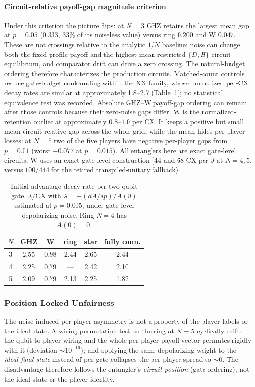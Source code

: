 \documentclass[conference,letterpaper,10pt]{IEEEtran}
\begin{document}
\paragraph{Circuit-relative payoff-gap magnitude criterion}
Under this criterion the picture flips: at $N=3$ GHZ retains the largest
mean gap at $p=0.05$ ($0.333$, $33\%$ of its noiseless value) versus ring
$0.200$ and W $0.047$. These are not crossings relative to the analytic $1/N$
baseline: noise can change both the fixed-profile payoff and the highest-mean
restricted $\{D,H\}$ circuit equilibrium, and comparator drift can drive a
zero crossing. The natural-budget ordering therefore characterizes the
production circuits. Matched-count controls reduce gate-budget confounding
within the XX family, whose normalized per-CX decay rates are similar at
approximately 1.8--2.7 (Table~\ref{tab:controls}); no statistical equivalence
test was recorded. Absolute GHZ--W payoff-gap ordering can remain after those controls
because their zero-noise gaps differ. W is the normalized-retention outlier at
approximately $0.8$--$1.0$ per CX. It keeps a positive but small mean
circuit-relative gap across the whole grid, while the mean hides per-player
losses: at $N=5$ two of the five players have negative per-player gaps from
$p=0.01$ (worst $-0.077$ at $p=0.015$). All entanglers here are exact
gate-level circuits; W uses an exact gate-level construction (44 and 68 CX
per $J$ at $N=4,5$, versus $100$/$444$ for the retired transpiled-unitary
fallback).

\begin{table}[t]
\centering
\caption{Initial advantage decay rate per two-qubit gate,
$\lambda/\mathrm{CX}$ with $\lambda=-(dA/dp)/A(0)$ estimated at $p=0.005$,
under gate-level depolarizing noise. Ring $N=4$ has $A(0)=0$.}
\label{tab:controls}
\begin{tabular}{@{}cccccc@{}}
\toprule
$N$ & GHZ & W & ring & star & fully conn.\\
\midrule
3 & 2.55 & 0.98 & 2.44 & 2.65 & 2.44\\
4 & 2.25 & 0.79 & --- & 2.42 & 2.10\\
5 & 2.09 & 0.79 & 2.13 & 2.25 & 1.82\\
\bottomrule
\end{tabular}
\end{table}

\subsubsection{Position-Locked Unfairness}
The noise-induced per-player asymmetry is not a property of the player labels
or the ideal state. A wiring-permutation test on the ring at $N=5$
cyclically shifts the
qubit-to-player wiring and the whole per-player payoff vector permutes
rigidly with it (deviation $\sim10^{-16}$); and applying the same depolarizing
weight to the \emph{ideal final state} instead of per-gate collapses the
per-player spread to $\sim0$. The disadvantage therefore follows the
entangler's \emph{circuit position} (gate ordering), not the ideal state or
the player identity.
\end{document}
